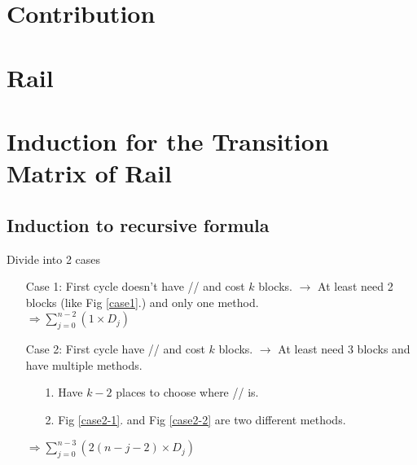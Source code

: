 \section{Contribution}

\section{Rail}
\label{rail}


\section{Induction for the Transition Matrix of Rail}
\label{induction for Rail}

\subsection{Induction to recursive formula} 

Divide into 2 cases\\

\begin{enumerate}
    \item[Case 1:] 
        First cycle doesn't have // and cost $k$ blocks. $\rightarrow$ At least need 2 blocks (like Fig \ref{case1}.) and only one method.\\

        $\Rightarrow \sum\limits_{j=0}^{n-2}(1\times D_j)$\\

    \item[Case 2:]
        First cycle have // and cost $k$ blocks. $\rightarrow$ At least need 3 blocks and have multiple methods.\\
        \begin{enumerate}
            \item [1.]
               Have $k-2$ places to choose where // is.\\

            \item [2.]
                Fig \ref{case2-1}. and Fig \ref{case2-2} are two different methods.\\
        \end{enumerate}
        
        $\Rightarrow \sum\limits_{j=0}^{n-3}(2(n-j-2)\times D_j)$
\end{enumerate}

